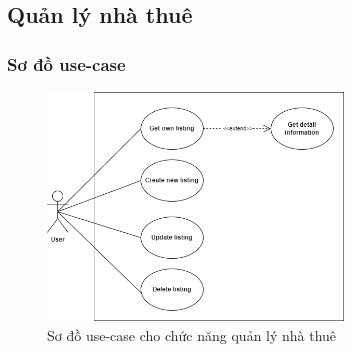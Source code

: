 \subsection{Quản lý nhà thuê}
\subsubsection{Sơ đồ use-case}
\begin{figure}[H]
    \centering
    \includegraphics[width=0.7\textwidth]{Images/UseCase/ManageListing.png}
    \caption{Sơ đồ use-case cho chức năng quản lý nhà thuê}
\end{figure}
